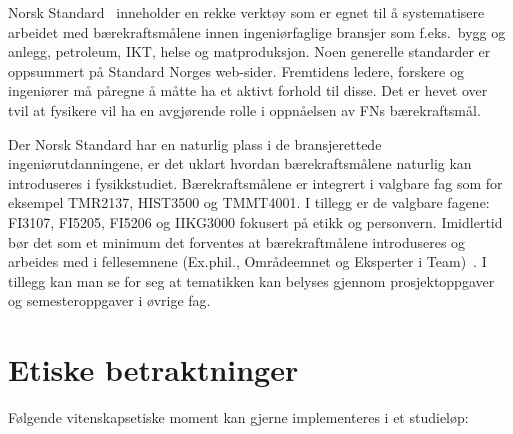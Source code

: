 \documentclass{article}
\begin{document}
Norsk Standard~\cite{StandardNorge} inneholder en rekke verktøy som er egnet til å systematisere arbeidet med bærekraftsmålene innen ingeniørfaglige bransjer som f.eks.~bygg og anlegg, petroleum, IKT, helse og matproduksjon.
Noen generelle standarder er oppsummert på Standard Norges web-sider.
Fremtidens ledere, forskere og ingeniører må påregne å måtte ha et aktivt forhold til disse.
Det er hevet over tvil at fysikere vil ha en avgjørende rolle i oppnåelsen av FNs bærekraftsmål.

Der Norsk Standard har en naturlig plass i de bransjerettede ingeniørutdanningene, er det uklart hvordan bærekraftsmålene naturlig kan introduseres i fysikkstudiet. Bærekraftsmålene er integrert i valgbare fag som for eksempel TMR2137, HIST3500 og TMMT4001. I tillegg er de valgbare fagene: FI3107, FI5205, FI5206 og IIKG3000 fokusert på etikk og personvern. Imidlertid bør det som et minimum det forventes at bærekraftmålene introduseres og arbeides med i fellesemnene (Ex.phil., Områdeemnet og Eksperter i Team)~\cite{NTNUFellesEmner}.
I tillegg kan man se for seg at tematikken kan belyses gjennom prosjektoppgaver og semesteroppgaver i øvrige fag.

\section{Etiske betraktninger}
Følgende vitenskapsetiske moment kan gjerne implementeres i et studieløp:
\end{document}
